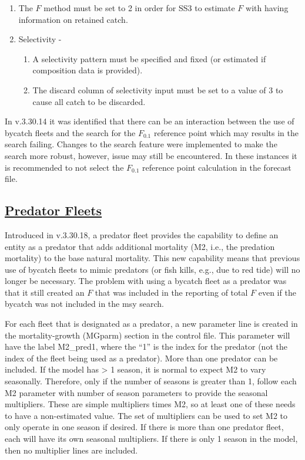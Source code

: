\begin{enumerate}
	\item The $F$ method must be set to 2 in order for SS3 to estimate $F$ with having information on retained catch.
	\item Selectivity - 
	\begin{enumerate}
		\item A selectivity pattern must be specified and fixed (or estimated if composition data is provided).
		\item The discard column of selectivity input must be set to a value of 3 to cause all catch to be discarded.
	\end{enumerate}	
\end{enumerate}

In v.3.30.14 it was identified that there can be an interaction between the use of bycatch fleets and the search for the $F_{0.1}$ reference point which may results in the search failing.  Changes to the search feature were implemented to make the search more robust, however, issue may still be encountered. In these instances it is recommended to not select the $F_{0.1}$ reference point calculation in the forecast file.

\hypertarget{PredatorFleets}{}
\subsection[Predator Fleets]{\protect\hyperlink{PredatorFleets}{Predator Fleets}}

Introduced in v.3.30.18, a predator fleet provides the capability to define an entity as a predator that adds additional mortality (M2, i.e., the predation mortality) to the base natural mortality. This new capability means that previous use of bycatch fleets to mimic predators (or fish kills, e.g., due to red tide) will no longer be necessary. The problem with using a bycatch fleet as a predator was that it still created an $F$ that was included in the reporting of total $F$ even if the bycatch was not included in the \gls{msy} search.

For each fleet that is designated as a predator, a new parameter line is created in the mortality-growth (MGparm) section in the control file. This parameter will have the label M2\_pred1, where the ``1'' is the index for the predator (not the index of the fleet being used as a predator). More than one predator can be included. If the model has > 1 season, it is normal to expect M2 to vary seasonally. Therefore, only if the number of seasons is greater than 1, follow each M2 parameter with number of season parameters to provide the seasonal multipliers. These are simple multipliers times M2, so at least one of these needs to have a non-estimated value. The set of multipliers can be used to set M2 to only operate in one season if desired. If there is more than one predator fleet, each will have its own seasonal multipliers. If there is only 1 season in the model, then no multiplier lines are included.

